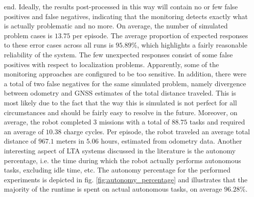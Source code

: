 \documentclass[english, master, utf8]{base/thesis_KBS}
\begin{document}
end. Ideally, the results post-processed in this way will contain no or few false positives and false negatives, indicating that the monitoring detects exactly what is actually
problematic and no more. 
On average, the number of simulated problem cases is $13.75$ per episode. The average proportion of expected responses to these error cases across all runs is
$95.89\%$, which highlights a fairly reasonable reliability of the system. The few unexpected responses consist of some false positives with respect to localization problems.
Apparently, some of the monitoring approaches are configured to be too sensitive. In addition, there were a total of two false negatives for the same simulated problem, namely
divergence between odometry and GNSS estimates of the total distance traveled. This is most likely due to the fact that the way this is simulated is not perfect for all circumstances
and should be fairly easy to resolve in the future. Moreover, on average, the robot completed $3$ missions with a total of $88.75$ tasks and required an average of
$10.38$ charge cycles. Per episode, the robot traveled an average total distance of $967.1$ meters in $5.06$ hours, estimated from odometry data. Another interesting aspect of LTA systems
discussed in the literature is the autonomy percentage, i.e. the time during which the robot actually performs autonomous tasks, excluding idle time, etc. The autonomy percentage for
the performed experiments is depicted in fig. \ref{fig:autonomy_percentage} and illustrates that the majority of the runtime is spent on actual autonomous tasks, on average $96.28\%$.
\end{document}
